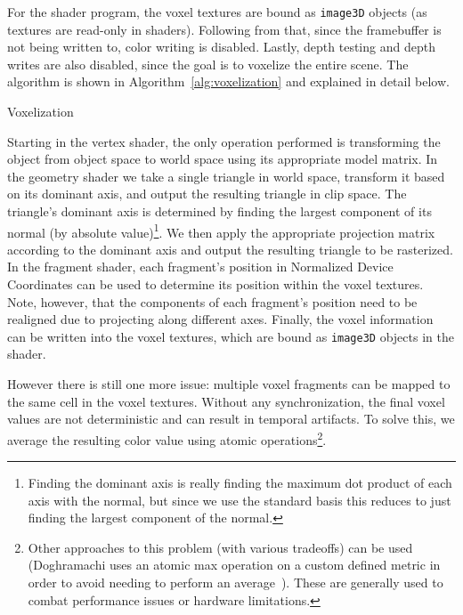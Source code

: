 For the shader program, the voxel textures are bound as \texttt{image3D} objects (as textures are read-only in shaders). Following from that, since the framebuffer is not being written to, color writing is disabled. Lastly, depth testing and depth writes are also disabled, since the goal is to voxelize the entire scene. The algorithm is shown in Algorithm~\ref{alg:voxelization} and explained in detail below.

\begin{algorithm}
    \caption{Voxelization}
    \label{alg:voxelization}
    \begin{algorithmic}
        \EndFor
         
        \EndFor

    \end{algorithmic}
\end{algorithm}

Starting in the vertex shader, the only operation performed is transforming the object from object space to world space using its appropriate model matrix. In the geometry shader we take a single triangle in world space, transform it based on its dominant axis, and output the resulting triangle in clip space. The triangle's dominant axis is determined by finding the largest component of its normal (by absolute value)\footnote{Finding the dominant axis is really finding the maximum dot product of each axis with the normal, but since we use the standard basis this reduces to just finding the largest component of the normal.}. We then apply the appropriate projection matrix according to the dominant axis and output the resulting triangle to be rasterized. In the fragment shader, each fragment's position in Normalized Device Coordinates can be used to determine its position within the voxel textures. Note, however, that the components of each fragment's position need to be realigned due to projecting along different axes. Finally, the voxel information can be written into the voxel textures, which are bound as \texttt{image3D} objects in the shader.

However there is still one more issue: multiple voxel fragments can be mapped to the same cell in the voxel textures. Without any synchronization, the final voxel values are not deterministic and can result in temporal artifacts. To solve this, we average the resulting color value using atomic operations\footnote{Other approaches to this problem (with various tradeoffs) can be used (Doghramachi uses an atomic max operation on a custom defined metric in order to avoid needing to perform an average~\cite{doghramachi2013rasterized}). These are generally used to combat performance issues or hardware limitations.}.

